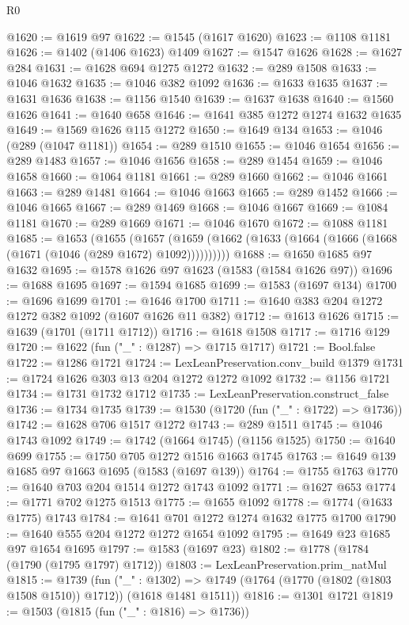 \begin{lexlean}{R0}
\begin{coremodule}
@1620 := @1619 @97
@1622 := @1545 (@1617 @1620)
@1623 := @1108 @1181
@1626 := @1402 (@1406 @1623) @1409
@1627 := @1547 @1626
@1628 := @1627 @284
@1631 := @1628 @694 @1275 @1272
@1632 := @289 @1508
@1633 := @1046 @1632
@1635 := @1046 @382 @1092
@1636 := @1633 @1635
@1637 := @1631 @1636
@1638 := @1156 @1540
@1639 := @1637 @1638
@1640 := @1560 @1626
@1641 := @1640 @658
@1646 := @1641 @385 @1272 @1274 @1632 @1635
@1649 := @1569 @1626 @115 @1272
@1650 := @1649 @134
@1653 := @1046 (@289 (@1047 @1181))
@1654 := @289 @1510
@1655 := @1046 @1654
@1656 := @289 @1483
@1657 := @1046 @1656
@1658 := @289 @1454
@1659 := @1046 @1658
@1660 := @1064 @1181
@1661 := @289 @1660
@1662 := @1046 @1661
@1663 := @289 @1481
@1664 := @1046 @1663
@1665 := @289 @1452
@1666 := @1046 @1665
@1667 := @289 @1469
@1668 := @1046 @1667
@1669 := @1084 @1181
@1670 := @289 @1669
@1671 := @1046 @1670
@1672 := @1088 @1181
@1685 := @1653
    (@1655
      (@1657 (@1659 (@1662 (@1633 (@1664 (@1666 (@1668 (@1671 (@1046 (@289 @1672) @1092))))))))))
@1688 := @1650 @1685 @97 @1632
@1695 := @1578 @1626 @97 @1623 (@1583 (@1584 @1626 @97))
@1696 := @1688 @1695
@1697 := @1594 @1685
@1699 := @1583 (@1697 @134)
@1700 := @1696 @1699
@1701 := @1646 @1700
@1711 := @1640 @383 @204 @1272 @1272 @382 @1092 (@1607 @1626 @11 @382)
@1712 := @1613 @1626
@1715 := @1639 (@1701 (@1711 @1712))
@1716 := @1618 @1508
@1717 := @1716 @129
@1720 := @1622 (fun ("_" : @1287) => @1715 @1717)
@1721 := Bool.false
@1722 := @1286 @1721
@1724 := LexLeanPreservation.conv_build @1379
@1731 := @1724 @1626 @303 @13 @204 @1272 @1272 @1092
@1732 := @1156 @1721
@1734 := @1731 @1732 @1712
@1735 := LexLeanPreservation.construct_false
@1736 := @1734 @1735
@1739 := @1530 (@1720 (fun ("_" : @1722) => @1736))
@1742 := @1628 @706 @1517 @1272
@1743 := @289 @1511
@1745 := @1046 @1743 @1092
@1749 := @1742 (@1664 @1745) (@1156 @1525)
@1750 := @1640 @699
@1755 := @1750 @705 @1272 @1516 @1663 @1745
@1763 := @1649 @139 @1685 @97 @1663 @1695 (@1583 (@1697 @139))
@1764 := @1755 @1763
@1770 := @1640 @703 @204 @1514 @1272 @1743 @1092
@1771 := @1627 @653
@1774 := @1771 @702 @1275 @1513
@1775 := @1655 @1092
@1778 := @1774 (@1633 @1775) @1743
@1784 := @1641 @701 @1272 @1274 @1632 @1775 @1700
@1790 := @1640 @555 @204 @1272 @1272 @1654 @1092
@1795 := @1649 @23 @1685 @97 @1654 @1695
@1797 := @1583 (@1697 @23)
@1802 := @1778 (@1784 (@1790 (@1795 @1797) @1712))
@1803 := LexLeanPreservation.prim_natMul
@1815 := @1739
    (fun ("_" : @1302) =>
    @1749 (@1764 (@1770 (@1802 (@1803 @1508 @1510)) @1712)) (@1618 @1481 @1511))
@1816 := @1301 @1721
@1819 := @1503 (@1815 (fun ("_" : @1816) => @1736))

\end{coremodule}
\end{lexlean}

